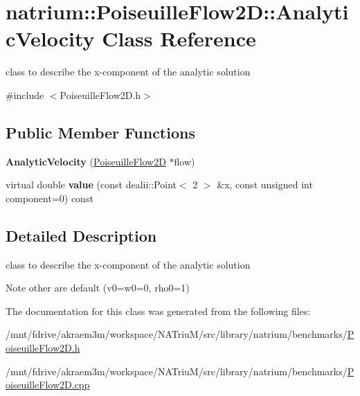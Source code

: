 \hypertarget{classnatrium_1_1PoiseuilleFlow2D_1_1AnalyticVelocity}{
\section{natrium::PoiseuilleFlow2D::AnalyticVelocity Class Reference}
\label{classnatrium_1_1PoiseuilleFlow2D_1_1AnalyticVelocity}
}


class to describe the x-\/component of the analytic solution  


{\ttfamily \#include $<$PoiseuilleFlow2D.h$>$}\subsection*{Public Member Functions}
\begin{DoxyCompactItemize}
\item 
\hypertarget{classnatrium_1_1PoiseuilleFlow2D_1_1AnalyticVelocity_a2586adcf8e868b937a1870372ca33d8a}{
{\bfseries AnalyticVelocity} (\hyperlink{classnatrium_1_1PoiseuilleFlow2D}{PoiseuilleFlow2D} $\ast$flow)}
\label{classnatrium_1_1PoiseuilleFlow2D_1_1AnalyticVelocity_a2586adcf8e868b937a1870372ca33d8a}

\item 
\hypertarget{classnatrium_1_1PoiseuilleFlow2D_1_1AnalyticVelocity_a251a3b4a0693bebcf92d7df82b43b436}{
virtual double {\bfseries value} (const dealii::Point$<$ 2 $>$ \&x, const unsigned int component=0) const }
\label{classnatrium_1_1PoiseuilleFlow2D_1_1AnalyticVelocity_a251a3b4a0693bebcf92d7df82b43b436}

\end{DoxyCompactItemize}


\subsection{Detailed Description}
class to describe the x-\/component of the analytic solution \begin{DoxyNote}{Note}
other are default (v0=w0=0, rho0=1) 
\end{DoxyNote}


The documentation for this class was generated from the following files:\begin{DoxyCompactItemize}
\item 
/mnt/fdrive/akraem3m/workspace/NATriuM/src/library/natrium/benchmarks/\hyperlink{PoiseuilleFlow2D_8h}{PoiseuilleFlow2D.h}\item 
/mnt/fdrive/akraem3m/workspace/NATriuM/src/library/natrium/benchmarks/\hyperlink{PoiseuilleFlow2D_8cpp}{PoiseuilleFlow2D.cpp}\end{DoxyCompactItemize}
